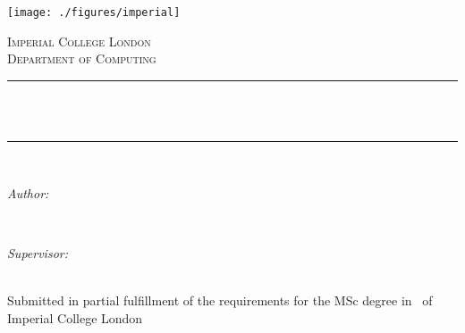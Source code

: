 \begin{titlepage}

    \newcommand{\HRule}{\rule{\linewidth}{0.5mm}} %
    
    
    \texttt{[image: ./figures/imperial]}\\[0.5cm] 
    
    \center %
    
    \textsc{\Large Imperial College London}\\[0.5cm] 
    \textsc{\large Department of Computing}\\[0.5cm] 
    
    \HRule \\[0.4cm]
    { \huge \bfseries \reporttitle}\\ %
    \HRule \\[1.5cm]
     
    \begin{minipage}{0.4\textwidth}
    \begin{flushleft} \large
    \emph{Author:}\\
    \reportauthor %
    \end{flushleft}
    \end{minipage}
    ~
    \begin{minipage}{0.4\textwidth}
    \begin{flushright} \large
    \emph{Supervisor:} \\
    \supervisor %
    \end{flushright}
    \end{minipage}\\[4cm]
    
    \vfill %
    Submitted in partial fulfillment of the requirements for the MSc degree in
    \degreetype~of Imperial College London\\[0.5cm]
    
    \makeatletter
    \@date 
    \makeatother
    
    
    \end{titlepage}
    